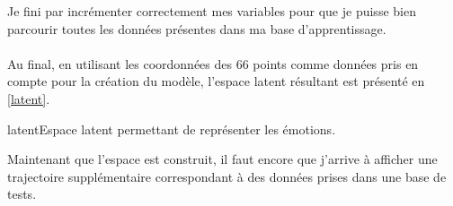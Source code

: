 \documentclass[poster]{polytech/polytech}
\begin{document}
Je fini par incrémenter correctement mes variables pour que je puisse bien parcourir toutes les données présentes dans ma base d'apprentissage.\\
\\
Au final, en utilisant les coordonnées des 66 points comme données pris en compte pour la création du modèle, l'espace latent résultant est présenté en \autoref{latent}.\\
\begin{Figure}{latent}{Espace latent permettant de représenter les émotions.}
\end{Figure}

Maintenant que l'espace est construit, il faut encore que j'arrive à afficher une trajectoire supplémentaire correspondant à des données prises dans une base de tests.
\end{document}
